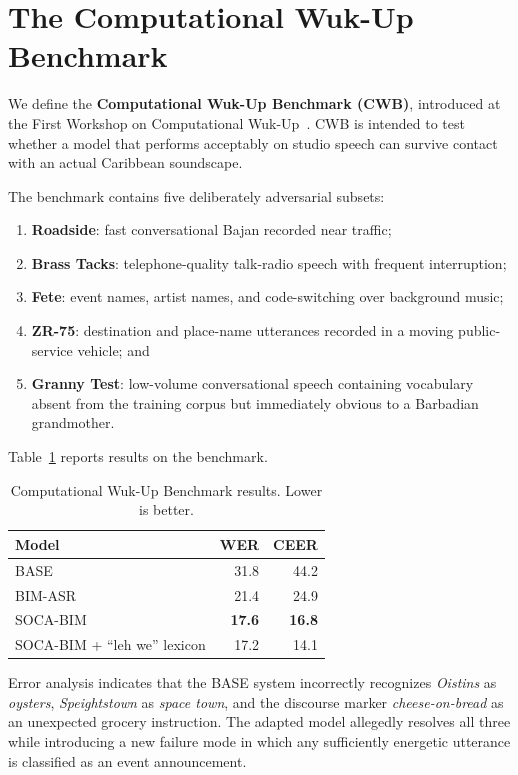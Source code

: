 \documentclass[10pt,twocolumn]{article}
\begin{document}
\appendix
\section{The Computational Wuk-Up Benchmark}\label{app:cwb}
We define the \textbf{Computational Wuk-Up Benchmark (CWB)}, introduced at the First Workshop on Computational Wuk-Up~\cite{smallfete2025}. CWB is intended to test whether a model that performs acceptably on studio speech can survive contact with an actual Caribbean soundscape.

The benchmark contains five deliberately adversarial subsets:
\begin{enumerate}
\item \textbf{Roadside}: fast conversational Bajan recorded near traffic;
\item \textbf{Brass Tacks}: telephone-quality talk-radio speech with frequent interruption;
\item \textbf{Fete}: event names, artist names, and code-switching over background music;
\item \textbf{ZR-75}: destination and place-name utterances recorded in a moving public-service vehicle; and
\item \textbf{Granny Test}: low-volume conversational speech containing vocabulary absent from the training corpus but immediately obvious to a Barbadian grandmother.
\end{enumerate}

Table~\ref{tab:fake} reports results on the benchmark.

\begin{table}[h]
\centering
\caption{Computational Wuk-Up Benchmark results. Lower is better.}
\label{tab:fake}
\scriptsize
\begin{tabular}{lrr}
\toprule
\textbf{Model} & \textbf{WER} & \textbf{CEER}\\
\midrule
BASE & 31.8 & 44.2\\
BIM-ASR & 21.4 & 24.9\\
SOCA-BIM & \textbf{17.6} & \textbf{16.8}\\
SOCA-BIM + ``leh we'' lexicon & 17.2 & 14.1\\
\bottomrule
\end{tabular}
\end{table}

Error analysis indicates that the BASE system incorrectly recognizes \emph{Oistins} as \emph{oysters}, \emph{Speightstown} as \emph{space town}, and the discourse marker \emph{cheese-on-bread} as an unexpected grocery instruction. The adapted model allegedly resolves all three while introducing a new failure mode in which any sufficiently energetic utterance is classified as an event announcement.
\end{document}
